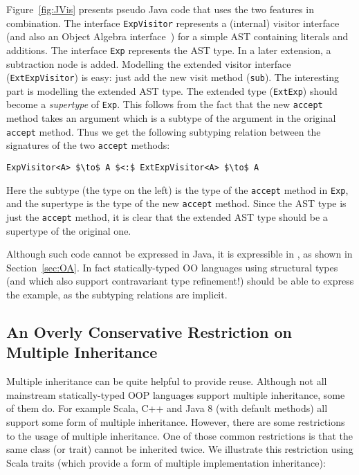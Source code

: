 Figure~\ref{fig:JVis} presents pseudo Java code that uses the two features in
combination. The interface \lstinline{ExpVisitor} represents a (internal)
visitor interface (and also an Object Algebra
interface~\cite{oliveira2012extensibility}) for a simple AST containing literals
and additions. The interface \lstinline{Exp} represents the AST type. In a
later extension, a subtraction node is added. Modelling the extended visitor
interface (\lstinline{ExtExpVisitor}) is easy: just add the new visit method
(\lstinline{sub}). The interesting part is modelling the extended AST type. The
extended type (\lstinline{ExtExp}) should become a \emph{supertype} of
\lstinline{Exp}. This follows from the fact that the new \lstinline{accept}
method takes an argument which is a subtype of the argument in the original \lstinline{accept}
method. Thus we get the following subtyping relation between the signatures of
the two \lstinline{accept} methods:

\begin{lstlisting}[mathescape=true]
ExpVisitor<A> $\to$ A $<:$ ExtExpVisitor<A> $\to$ A
\end{lstlisting}

\noindent Here the subtype (the type on the left) is the type of the
\lstinline{accept} method in \lstinline{Exp}, and the supertype is the type of
the new \lstinline{accept} method. Since the AST type is just the
\lstinline{accept} method, it is clear that the extended AST type should be a
supertype of the original one. 

Although such code cannot be expressed in Java, it is expressible in
\name, as shown in Section~\ref{sec:OA}. In fact statically-typed
OO languages using structural types (and which also support
contravariant type refinement!) should be able to express 
the example, as the subtyping relations are implicit.

\subsection{An Overly Conservative Restriction on Multiple Inheritance}

Multiple inheritance can be quite helpful to provide reuse. Although not all
mainstream statically-typed OOP languages support multiple inheritance, some of
them do. For example Scala, C++ and Java 8 (with default methods) all support
some form of multiple inheritance. However, there are some restrictions to the
usage of multiple inheritance. One of those common restrictions is that the same
class (or trait) cannot be inherited twice. We illustrate this restriction using
Scala traits (which provide a form of multiple implementation inheritance):

